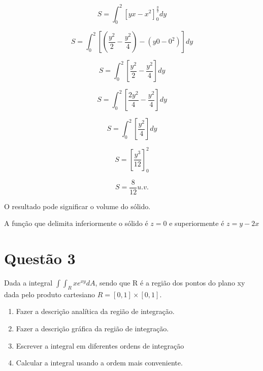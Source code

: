 \documentclass[10pt,a4paper]{article}
\begin{document}
	\begin{equation*}
		S = \int_{0}^{2} \left[ yx-x^2 \right]_0^{\frac{y}{2}} dy
	\end{equation*}

	\begin{equation*}
		S = \int_{0}^{2} \left[ \left(\frac{y^2}{2}-\frac{y^2}{4}\right) - \left(y0-0^2\right) \right] dy
	\end{equation*}	
	
	\begin{equation*}
		S = \int_{0}^{2} \left[\frac{y^2}{2}-\frac{y^2}{4} \right] dy
	\end{equation*}	
	
	\begin{equation*}
		S = \int_{0}^{2} \left[\frac{2y^2}{4}-\frac{y^2}{4} \right] dy
	\end{equation*}
	
	\begin{equation*}
		S = \int_{0}^{2} \left[\frac{y^2}{4}\right] dy
	\end{equation*}	
	
	\begin{equation*}
		S = \left[\frac{y^3}{12} \right]_0^2
	\end{equation*}
	
	\begin{equation*}
		S = \frac{8}{12} u.v.
	\end{equation*}	
	
	O resultado pode significar o volume do sólido.
	
	A função que delimita inferiormente o sólido é $ z = 0 $ e superiormente é $ z = y - 2x $
	
	\section*{Questão 3}
	
	Dada a integral $ \int \int_R x e^{xy} dA $, sendo que R é a região dos pontos do plano xy dada pelo produto cartesiano $ R=[0, 1] \times [0, 1] $.
	
	\begin{enumerate}[a]
		\item Fazer a descrição analítica da região de integração.
		\item Fazer a descrição gráfica da região de integração.
		\item Escrever a integral em diferentes ordens de integração
		\item Calcular a integral usando a ordem mais conveniente.
	\end{enumerate}
\end{document}
